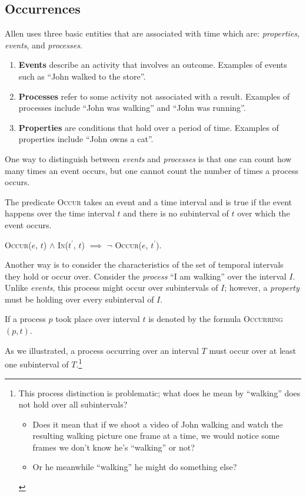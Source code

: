 \subsection{Occurrences}
Allen uses three basic entities that are associated with time which are: \textit{properties}, \textit{events}, and \textit{processes}.
\begin{enumerate}
	\item \textbf{Events} describe an activity that involves an outcome. Examples of events such as ``John walked to the store''.

	\item \textbf{Processes} refer to some activity not associated with a result. Examples of processes include ``John was walking'' and ``John was running''.

	\item \textbf{Properties} are conditions that hold over a period of time. Examples of properties include ``John owns a cat''.
\end{enumerate}
One way to distinguish between \textit{events} and \textit{processes} is that one can count how many times an event occurs, but one cannot count
the number of times a process occurs.


The predicate \textsc{Occur} takes an event and a time interval and is true if the event happens over the time interval $t$ and there is no subinterval of $t$
over which the event occurs.

\begin{center}
	\textsc{Occur}($e$, $t$) $\land$ \textsc{In}($t^\prime$, $t$) $\implies$ \(\lnot\) \textsc{Occur}($e$, $t^\prime$).
\end{center}

Another way is to consider the characteristics of the set of temporal intervals they hold or occur over.
Consider the \textit{process} ``I am walking'' over the interval $I$. Unlike \textit{events}, this process might occur over subintervals of $I$; however, a \textit{property} must be holding over every subinterval of $I$.


If a process $p$ took place over interval $t$ is denoted by the formula \textsc{Occurring}$(p,t)$.


As we illustrated, a process occurring over an interval $T$ must occur over at least one subinterval of $T$.\footnote{This process distinction is problematic; what does he mean by ``walking'' does not hold over all subintervals?
	\begin{itemize}
		\item
		      Does it mean that if we shoot a video of John walking and watch the resulting walking picture one frame at a time, we would notice some frames we don't know he's ``walking'' or not?
		\item Or he meanwhile ``walking'' he might do something else?
	\end{itemize}
}

